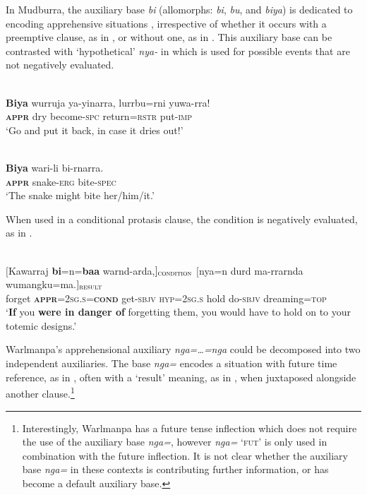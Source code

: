 \documentclass[output=paper,colorlinks,citecolor=brown]{langscibook}
\begin{document}
In Mudburra, the auxiliary base \textit{bi} (allomorphs: \textit{bi}, \textit{bu}, and \textit{biya}) is dedicated to encoding apprehensive situations \citep[104]{osgarby_verbal_2018}, irrespective of whether it occurs with a preemptive clause, as in , or without one, as in . This auxiliary base can be contrasted with `hypothetical' \textit{nya-} in  which is used for possible events that are not negatively evaluated.

\ea 
{} \\
\gll \textbf{Biya} wurruja ya-yinarra, lurrbu=rni yuwa-rra! \\
\textsc{\textbf{appr}} dry become-\textsc{spc} return=\textsc{rstr} put-\textsc{imp} \\
\glt `Go and put it back, in case it dries out!'
\label{ex:bro49}
\z

\ea 
{} \\
\gll \textbf{Biya} wari-li bi-rnarra. \\
\textbf{\textsc{appr}} snake-\textsc{erg} bite-\textsc{spec} \\
\glt `The snake might bite her/him/it.'
\label{ex:bro50}
\z

When used in a conditional protasis clause, the condition is negatively evaluated, as in .



\ea 
{} \\
\gll $[$Kawarraj \textbf{bi}=n=\textbf{baa} {warnd-arda,$]_\textnormal{\textsc{condition}}$ \hspace*{2cm}} $[$nya=n durd ma-rrarnda wumangku=ma.$]_\textnormal{\textsc{result}}$ \\
forget \textsc{\textbf{appr}=2sg.s=\textbf{cond}} get-\textsc{sbjv} \textsc{hyp=2sg.s} hold do-\textsc{sbjv} dreaming=\textsc{top} \\
\glt `\textbf{If} you \textbf{were in danger of} forgetting them, you would have to hold on to your totemic designs.'
\label{ex:bro51}
\z


Warlmanpa's apprehensional auxiliary \textit{nga=\ldots=nga} could be decomposed into two independent auxiliaries. The base \textit{nga=} encodes a situation with future time reference, as in , often with a `result' meaning, as in , when juxtaposed alongside another clause.\footnote{Interestingly, Warlmanpa has a future tense inflection which does not require the use of the auxiliary base \textit{nga=}, however \textit{nga=} \textsc{`fut'} is only used in combination with the future inflection. It is not clear whether the auxiliary base \textit{nga=} in these contexts is contributing further information, or has become a default auxiliary base.}
\end{document}
